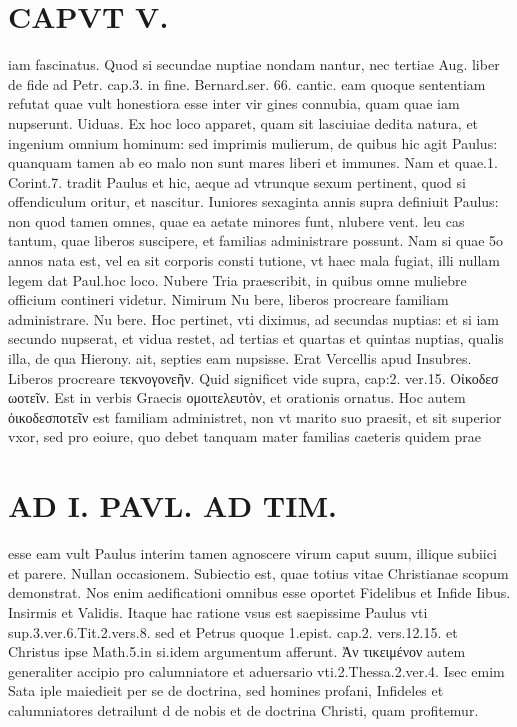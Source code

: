 \documentclass{article}
\begin{document}
\begin{pages}
\section*{CAPVT  V. }
\marginpar{[ p.299 ]}\pstart iam fascinatus. Quod si secundae nuptiae nondam nantur, nec tertiae Aug. liber  de fide ad Petr. cap.3. in fine. Bernard.ser. 66. cantic. eam quoque sententiam refutat quae vult honestiora esse inter vir gines connubia, quam quae iam nupserunt.  \pend\pstart Uiduas. Ex hoc loco apparet, quam sit lasciuiae dedita natura, et ingenium omnium hominum: sed imprimis mulierum, de quibus hic agit Paulus: quanquam tamen ab eo malo non sunt mares liberi et immunes. Nam et quae.1. Corint.7. tradit Paulus et hic, aeque ad vtrunque sexum pertinent, quod si offendiculum oritur, et nascitur.  \pend\pstart Iuniores sexaginta annis supra definiuit Paulus: non quod tamen omnes, quae ea aetate minores funt, nlubere vent. leu cas tantum, quae liberos suscipere, et familias administrare possunt. Nam si quae 5o annos nata est, vel ea sit corporis consti tutione, vt haec mala fugiat, illi nullam legem dat Paul.hoc loco.  \pend\pstart Nubere Tria praescribit, in quibus omne muliebre officium contineri videtur. Nimirum Nu bere, liberos procreare familiam administrare. Nu bere. Hoc pertinet, vti diximus, ad secundas nuptias: et si iam secundo nupserat, et vidua restet, ad tertias et quartas et quintas nuptias, qualis illa, de qua Hierony. ait, septies eam nupsisse. Erat Vercellis apud Insubres. Liberos procreare τεκνογονεῆν. Quid significet vide supra, cap:2. ver.15. Oἰκοδεσ ωοτεῖν. Est in verbis Graecis ομοιτελευτὸν, et orationis ornatus. Hoc autem ὀικοδεσποτεῖν est familiam administret, non vt marito suo praesit, et sit superior vxor, sed pro eoiure, quo debet tanquam mater familias caeteris quidem prae\pend
\section*{AD I. PAVL. AD TIM. }
\marginpar{[ p.300. ]}\pstart esse eam vult Paulus interim tamen agnoscere virum caput suum, illique subiici et parere. Nullan occasionem. Subiectio est, quae totius vitae Christianae scopum demonstrat. Nos enim aedificationi omnibus esse oportet Fidelibus et Infide Iibus. Insirmis et Validis. Itaque  hac ratione vsus est saepissime Paulus vti sup.3.ver.6.Tit.2.vers.8. sed et Petrus quoque 1.epist. cap.2. vers.12.15. et Christus ipse Math.5.in si.idem argumentum afferunt. Ἀν τικειμένον autem generaliter accipio pro calumniatore et aduersario vti.2.Thessa.2.ver.4. Isec emim Sata iple maiedieit per se de doctrina, sed homines profani, Infideles et calumniatores detrailunt d de nobis et de doctrina Christi, quam profitemur.  \pend
{}
{}

\end{pages}
\end{document}
